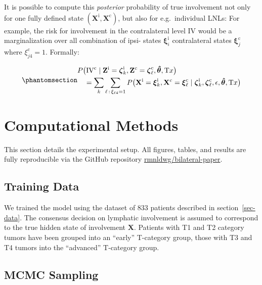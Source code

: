 \documentclass[
  sn-mathphys-num,
]{sn-jnl}
\begin{document}
It is possible to compute this \emph{posterior} probability of true
involvement not only for one fully defined state
\((\mathbf{X}^\text{i}, \mathbf{X}^\text{c})\), but also for
e.g.~individual LNLs: For example, the risk for involvement in the
contralateral level IV would be a marginalization over all combination
of ipsi- states \(\boldsymbol{\xi}^\text{i}_i\) contralateral states
\(\boldsymbol{\xi}^\text{c}_j\) where \(\xi^\text{c}_{j4}=1\). Formally:

\begin{equation}\phantomsection\label{eq-marg-over-posterior}{
\begin{multlined}
P \big( \text{IV}^\text{c} \mid \mathbf{Z}^\text{i}=\boldsymbol{\zeta}^\text{i}_k, \mathbf{Z}^\text{c}=\boldsymbol{\zeta}^\text{c}_\ell, \boldsymbol{\hat{\theta}}, \text{T}x \big) \\
= \sum_k \sum_{\ell \, : \, \xi_{\ell 4}=1} P \big( \mathbf{X}^\text{i} = \boldsymbol{\xi}^\text{i}_k, \mathbf{X}^\text{c} = \boldsymbol{\xi}^\text{c}_\ell \mid \boldsymbol{\zeta}^\text{i}_k, \boldsymbol{\zeta}^\text{c}_\ell, \epsilon, \boldsymbol{\hat{\theta}}, \text{T}x \big)
\end{multlined}
}\end{equation}

\section{Computational Methods}\label{sec-methods}

This section details the experimental setup. All figures, tables, and
results are fully reproducible via the GitHub repository
\href{https://github.com/rmnldwg/bilateral-paper}{rmnldwg/bilateral-paper}.

\subsection{Training Data}\label{sec-training-data}

We trained the model using the dataset of 833 patients described in
section~\ref{sec-data}. The consensus decision on lymphatic involvement
is assumed to correspond to the true hidden state of involvement
\(\mathbf{X}\). Patients with T1 and T2 category tumors have been
grouped into an ``early'' T-category group, those with T3 and T4 tumors
into the ``advanced'' T-category group.

\subsection{MCMC Sampling}\label{sec-sampling}
\end{document}
